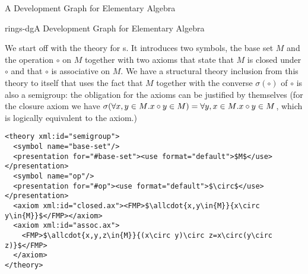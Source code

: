 \begin{tchapter}[id=dg-elal]{A Development Graph for Elementary Algebra}
\begin{myfig}{rings-dg}{A Development Graph for Elementary Algebra}
{}
\end{myfig}

We start off with the theory for {s}. It introduces two symbols, the base
set $M$ and the operation $\circ$ on $M$ together with two axioms that state that $M$ is
closed under $\circ$ and that $\circ$ is associative on $M$. We have a structural theory
inclusion from this theory to itself that uses the fact that $M$ together with the
converse $\sigma(\circ)$ of $\circ$ is also a semigroup: the obligation for the axioms can
be justified by themselves (for the closure axiom we have
$\sigma({\forall{x,y\in{M}}.{x\circ y\in{M}}})={\forall{y,x\in{M}}.{x\circ y\in{M}}}$, which
is logically equivalent to the axiom.)

\begin{lstlisting}[mathescape,
  index={theory-inclusion,morphism,requation}]
<theory xml:id="semigroup">
  <symbol name="base-set"/>
  <presentation for="#base-set"><use format="default">$M$</use></presentation>
  <symbol name="op"/>
  <presentation for="#op"><use format="default">$\circ$</use></presentation>
  <axiom xml:id="closed.ax"><FMP>$\allcdot{x,y\in{M}}{x\circ y\in{M}}$</FMP></axiom>
  <axiom xml:id="assoc.ax">
    <FMP>$\allcdot{x,y,z\in{M}}{(x\circ y)\circ z=x\circ(y\circ z)}$</FMP>
  </axiom>
</theory>


\end{lstlisting}
\end{tchapter}
